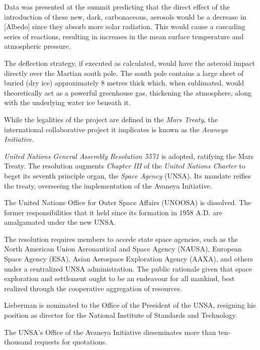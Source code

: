 Data was presented at the summit predicting that the direct effect of the introduction of these new, dark, carbonaceous, aerosols would be a decrease in [Albedo] since they absorb more solar radiation. This would cause a cascading series of reactions, resulting in increases in the mean surface temperature and atmospheric pressure.

The deflection strategy, if executed as calculated, would have the asteroid impact directly over the Martian south pole. The south pole contains a large sheet of buried  (dry ice) approximately 8 metres thick which, when sublimated, would theoretically act as a powerful greenhouse gas, thickening the atmosphere, along with the underlying water ice beneath it.

While the legalities of the project are defined in the {\it Mars Treaty}, the international collaborative project it implicates is known as the {\it Avaneya Initiative}.
\StopTimelineDate

{\it United Nations General Assembly Resolution 5571} is adopted, ratifying the Mars Treaty. The resolution augments {\it Chapter III} of the {\it United Nations Charter} to beget its seventh principle organ, the {\it Space Agency} (UNSA). Its mandate reifies the treaty, overseeing the implementation of the Avaneya Initiative.

The United Nations Office for Outer Space Affairs (UNOOSA) is dissolved. The former responsibilities that it held since its formation in 1958 A.D. are amalgamated under the new UNSA.

The resolution requires members to accede state space agencies, such as the North American Union Aeronautical and Space Agency (NAUSA), European Space Agency (ESA), Asian Aerospace Exploration Agency (AAXA), and others under a centralized UNSA administration. The public rationale given that space exploration and settlement ought to be an endeavour for all mankind, best realized through the cooperative aggregation of resources.

Lieberman is nominated to the Office of the President of the UNSA, resigning his position as director for the National Institute of Standards and Technology.
\StopTimelineDate

The UNSA's Office of the Avaneya Initiative disseminates more than ten-thousand requests for quotations.
\StopTimelineDate

